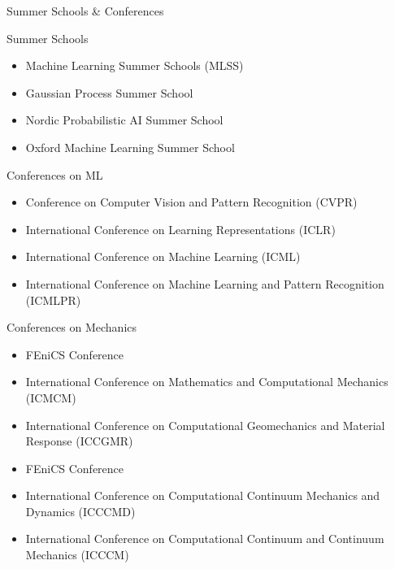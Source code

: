 \begin{frame}{Summer Schools \& Conferences}
{
  \begin{block}{\color{White} Summer Schools}
  \begin{itemize}
    \item Machine Learning Summer Schools (MLSS)
    \item Gaussian Process Summer School 
    \item Nordic Probabilistic AI Summer School
    \item Oxford Machine Learning Summer School
  \end{itemize}
  \end{block}
}
{
  \begin{block}{\color{White} Conferences on ML}
  \begin{itemize}
    \item Conference on Computer Vision and Pattern Recognition (CVPR)
    \item International Conference on Learning Representations (ICLR)
    \item International Conference on Machine Learning (ICML)
    \item International Conference on Machine Learning and Pattern Recognition (ICMLPR)
  \end{itemize}
  \end{block}
}

{
  \begin{block}{\color{White} Conferences on Mechanics}
  \begin{itemize}
    \item FEniCS Conference
    \item International Conference on Mathematics and Computational Mechanics (ICMCM)
    \item International Conference on Computational Geomechanics and Material Response (ICCGMR)
    \item FEniCS Conference
    \item International Conference on Computational Continuum Mechanics and Dynamics (ICCCMD)
\item International Conference on Computational Continuum and Continuum Mechanics (ICCCM)
  \end{itemize}
  \end{block}
}
\end{frame}



